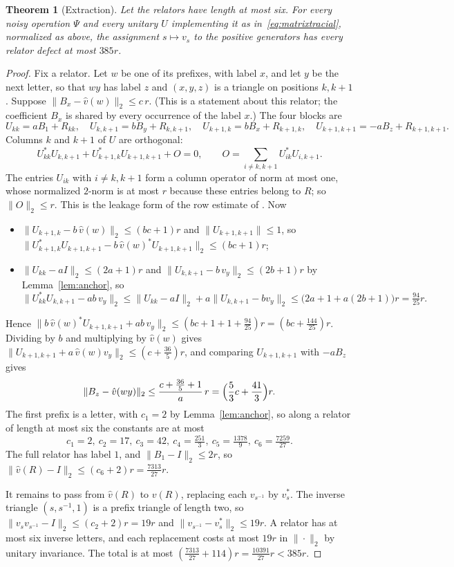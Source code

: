 \documentclass[11pt]{article}
\newtheorem{theorem}{Theorem}[section]
\begin{document}
\begin{theorem}[Extraction]\label{thm:extract}
Let the relators have length at most six.  For every noisy operation $\Psi$ and every unitary $U$ implementing it as in~\eqref{eq:matrixtracial}, normalized as above, the assignment $s\mapsto v_s$ to the positive generators has every relator defect at most $385r$.
\end{theorem}
\begin{proof}
Fix a relator.  Let $w$ be one of its prefixes, with label $x$, and let $y$ be the next letter, so that $wy$ has label $z$ and $(x,y,z)$ is a triangle on positions $k,k+1$.  Suppose $\|B_x-\hat v(w)\|_2\le c\,r$.  (This is a statement about this relator; the coefficient $B_x$ is shared by every occurrence of the label $x$.)  The four blocks are
\[
 U_{kk}=aB_1+R_{kk},\quad U_{k,k+1}=bB_y+R_{k,k+1},\quad U_{k+1,k}=bB_x+R_{k+1,k},\quad U_{k+1,k+1}=-aB_z+R_{k+1,k+1}.
\]
Columns $k$ and $k+1$ of $U$ are orthogonal:
\[
 U_{kk}^*U_{k,k+1}+U_{k+1,k}^*U_{k+1,k+1}+O=0,\qquad O=\sum_{i\ne k,k+1}U_{ik}^*U_{i,k+1}.
\]
The entries $U_{ik}$ with $i\ne k,k+1$ form a column operator of norm at most one, whose normalized $2$-norm is at most $r$ because these entries belong to $R$; so $\|O\|_2\le r$.  This is the leakage form of the row estimate of \cite[Appendix~I.2]{MghirbiDouglasV1}.  Now
\begin{itemize}
\item $\|U_{k+1,k}-b\,\hat v(w)\|_2\le(bc+1)r$ and $\|U_{k+1,k+1}\|\le1$, so $\|U_{k+1,k}^*U_{k+1,k+1}-b\,\hat v(w)^*U_{k+1,k+1}\|_2\le(bc+1)r$;
\item $\|U_{kk}-aI\|_2\le(2a+1)r$ and $\|U_{k,k+1}-b\,v_y\|_2\le(2b+1)r$ by Lemma~\ref{lem:anchor}, so
\[
 \|U_{kk}^*U_{k,k+1}-ab\,v_y\|_2\le\|U_{kk}-aI\|_2+a\|U_{k,k+1}-bv_y\|_2\le\bigl(2a+1+a(2b+1)\bigr)r=\tfrac{94}{25}r.
\]
\end{itemize}
Hence $\|b\,\hat v(w)^*U_{k+1,k+1}+ab\,v_y\|_2\le(bc+1+1+\tfrac{94}{25})r=(bc+\tfrac{144}{25})r$.  Dividing by $b$ and multiplying by $\hat v(w)$ gives $\|U_{k+1,k+1}+a\,\hat v(w)v_y\|_2\le(c+\tfrac{36}5)r$, and comparing $U_{k+1,k+1}$ with $-aB_z$ gives
\[
 \|B_z-\hat v(wy)\|_2\le\frac{c+\tfrac{36}5+1}{a}\,r=\Bigl(\frac53c+\frac{41}3\Bigr)r.
\]
The first prefix is a letter, with $c_1=2$ by Lemma~\ref{lem:anchor}, so along a relator of length at most six the constants are at most
\[
 c_1=2,\ c_2=17,\ c_3=42,\ c_4=\tfrac{251}3,\ c_5=\tfrac{1378}9,\ c_6=\tfrac{7259}{27}.
\]
The full relator has label $1$, and $\|B_1-I\|_2\le2r$, so $\|\hat v(R)-I\|_2\le(c_6+2)r=\tfrac{7313}{27}r$.

It remains to pass from $\hat v(R)$ to $v(R)$, replacing each $v_{s^{-1}}$ by $v_s^*$.  The inverse triangle $(s,s^{-1},1)$ is a prefix triangle of length two, so $\|v_sv_{s^{-1}}-I\|_2\le(c_2+2)r=19r$ and $\|v_{s^{-1}}-v_s^*\|_2\le19r$.  A relator has at most six inverse letters, and each replacement costs at most $19r$ in $\|\cdot\|_2$ by unitary invariance.  The total is at most $(\tfrac{7313}{27}+114)r=\tfrac{10391}{27}r<385r$.
\end{proof}
\end{document}
